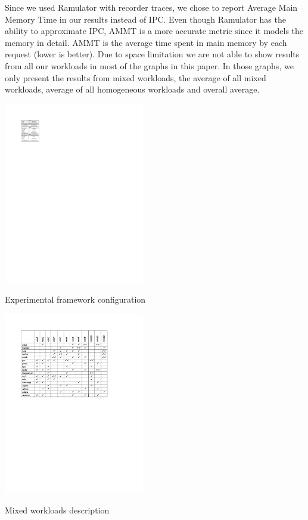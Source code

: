 Since we used Ramulator with recorder traces, we chose to report Average Main Memory Time in our results instead of IPC. Even though Ramulator has the ability to approximate IPC, AMMT is a more accurate metric since it models the memory in detail. AMMT is the average time spent in main memory by each request (lower is better). Due to space limitation we are not able to show results from all our workloads in most of the graphs in this paper. In those graphs, we only present the results from mixed workloads, the average of all mixed workloads, average of all homogeneous workloads and overall average.

\begin{table}[t]
  \includegraphics[width=0.46\textwidth]{figures/specs_table.pdf}
  \caption{Experimental framework configuration}
  \label{tab:specs}
\end{table}

\begin{table}[t]
  \includegraphics[width=0.46\textwidth]{figures/workloads_checkmarks.pdf}
  \caption{Mixed workloads description}
  \label{tab:workloads}
\end{table}
%

